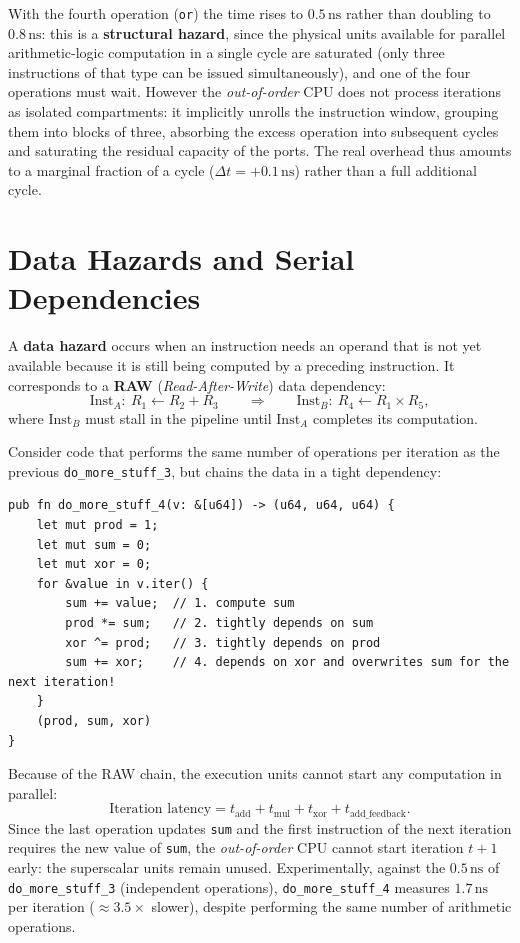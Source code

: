 With the fourth operation (\texttt{or}) the time rises to $0.5\,\text{ns}$ rather than doubling to $0.8\,\text{ns}$: this is a \textbf{structural hazard}, since the physical units available for parallel arithmetic-logic computation in a single cycle are saturated (only three instructions of that type can be issued simultaneously), and one of the four operations must wait. However the \textit{out-of-order} CPU does not process iterations as isolated compartments: it implicitly unrolls the instruction window, grouping them into blocks of three, absorbing the excess operation into subsequent cycles and saturating the residual capacity of the ports. The real overhead thus amounts to a marginal fraction of a cycle ($\Delta t = +0.1\,\text{ns}$) rather than a full additional cycle.

\FloatBarrier
\section{Data Hazards and Serial Dependencies}

\begin{definition}
A \textbf{data hazard} occurs when an instruction needs an operand that is not yet available because it is still being computed by a preceding instruction. It corresponds to a \textbf{RAW} (\textit{Read-After-Write}) data dependency:
\[
\text{Inst}_A:\ R_1 \leftarrow R_2 + R_3 \qquad \Longrightarrow \qquad \text{Inst}_B:\ R_4 \leftarrow R_1 \times R_5,
\]
where $\text{Inst}_B$ must stall in the pipeline until $\text{Inst}_A$ completes its computation.
\end{definition}

Consider code that performs the same number of operations per iteration as the previous \texttt{do\_more\_stuff\_3}, but chains the data in a tight dependency:

\begin{lstlisting}[style=rustcode,caption={Serial RAW dependency chain across four operations.}]
pub fn do_more_stuff_4(v: &[u64]) -> (u64, u64, u64) {
    let mut prod = 1;
    let mut sum = 0;
    let mut xor = 0;
    for &value in v.iter() {
        sum += value;  // 1. compute sum
        prod *= sum;   // 2. tightly depends on sum
        xor ^= prod;   // 3. tightly depends on prod
        sum += xor;    // 4. depends on xor and overwrites sum for the next iteration!
    }
    (prod, sum, xor)
}
\end{lstlisting}

Because of the RAW chain, the execution units cannot start any computation in parallel:
\[
\text{Iteration latency} = t_{\text{add}} + t_{\text{mul}} + t_{\text{xor}} + t_{\text{add\_feedback}}.
\]
Since the last operation updates \texttt{sum} and the first instruction of the next iteration requires the new value of \texttt{sum}, the \textit{out-of-order} CPU cannot start iteration $t+1$ early: the superscalar units remain unused. Experimentally, against the $0.5\,\text{ns}$ of \texttt{do\_more\_stuff\_3} (independent operations), \texttt{do\_more\_stuff\_4} measures $1.7\,\text{ns}$ per iteration ($\approx 3.5\times$ slower), despite performing the same number of arithmetic operations.

